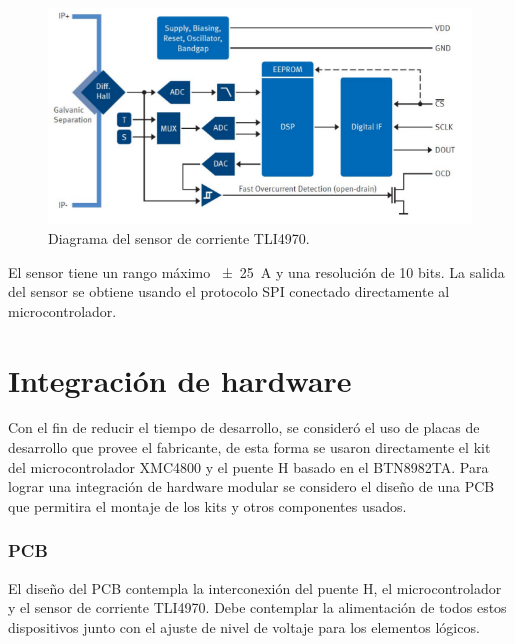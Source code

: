 \begin{figure}[H]
  \centering
  \includegraphics[scale=.45]{img/cap3/tli4970}
  \caption{Diagrama del sensor de corriente TLI4970.}
  \label{cap3_tli4970}
\end{figure}

El sensor tiene un rango máximo \SI{\pm 25}{\ampere} y una resolución de 10 bits. La salida del sensor se obtiene usando el protocolo SPI conectado directamente al microcontrolador.

\section{Integración de hardware}

Con el fin de reducir el tiempo de desarrollo, se consideró el uso de placas de desarrollo que provee el fabricante, de esta forma se usaron directamente el kit del microcontrolador XMC4800 y el puente H basado en el BTN8982TA. Para lograr una integración de hardware modular se considero el diseño de una PCB que permitira el montaje de los kits y otros componentes usados.

\subsubsection{PCB}

El diseño del PCB contempla la interconexión del puente H, el microcontrolador y el sensor de corriente TLI4970. Debe contemplar la alimentación de todos estos dispositivos junto con el ajuste de nivel de voltaje para los elementos lógicos.



